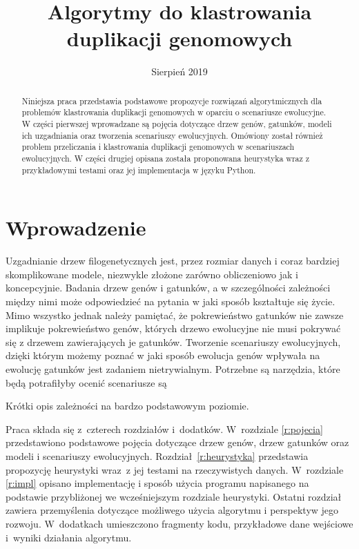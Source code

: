 \documentclass[licencjacka]{pracamgr}
\title{Algorytmy do klastrowania duplikacji genomowych}
\date{Sierpień 2019}
\begin{document}
\maketitle


\begin{abstract}
   Niniejsza praca przedstawia podstawowe propozycje rozwiązań algorytmicznych dla problemów klastrowania duplikacji genomowych w oparciu o scenariusze ewolucyjne. W części pierwszej wprowadzane są pojęcia dotyczące drzew genów, gatunków, modeli ich uzgadniania oraz tworzenia scenariuszy ewolucyjnych. Omówiony został również problem przeliczania i klastrowania duplikacji genomowych w scenariuszach ewolucyjnych. W części drugiej opisana została proponowana heurystyka wraz z przykładowymi testami oraz jej implementacja w języku Python.
\end{abstract}


\renewcommand{\contentsname}{Spis Treści}
\tableofcontents

\chapter*{Wprowadzenie}


Uzgadnianie drzew filogenetycznych jest, przez rozmiar danych i coraz bardziej skomplikowane modele, niezwykle złożone zarówno obliczeniowo jak i koncepcyjnie. Badania drzew genów i gatunków, a w szczególności zależności między nimi może odpowiedzieć na pytania w jaki sposób kształtuje się życie. Mimo wszystko jednak należy pamiętać, że pokrewieństwo gatunków nie zawsze implikuje pokrewieństwo genów, których drzewo ewolucyjne nie musi pokrywać się z drzewem zawierających je gatunków. Tworzenie scenariuszy ewolucyjnych, dzięki którym możemy poznać w jaki sposób ewolucja genów wpływała na ewolucję gatunków jest zadaniem nietrywialnym. Potrzebne są narzędzia, które będą potrafiłyby ocenić scenariusze są


Krótki opis zależności na bardzo podstawowym poziomie.


Praca składa się z~czterech rozdziałów i~dodatków.
W~rozdziale \ref{r:pojecia} przedstawiono podstawowe pojęcia dotyczące drzew genów, drzew gatunków oraz modeli i scenariuszy ewolucyjnych.  
Rozdział~\ref{r:heurystyka} przedstawia propozycję heurystyki wraz~z jej testami na rzeczywistych danych.  W~rozdziale \ref{r:impl} opisano implementację i sposób użycia programu napisanego na podstawie przybliżonej we wcześniejszym rozdziale heurystyki.
Ostatni rozdział zawiera przemyślenia dotyczące możliwego użycia algorytmu i perspektyw jego rozwoju. W~dodatkach umieszczono fragmenty kodu, przykładowe dane wejściowe i~wyniki działania algorytmu.
\end{document}
